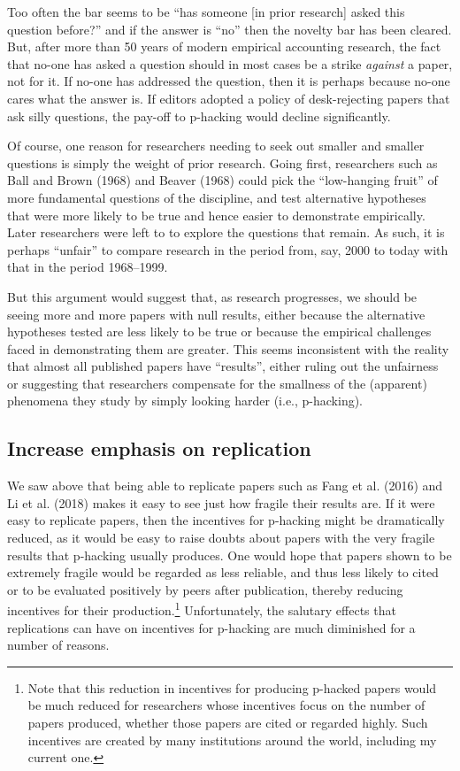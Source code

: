 \documentclass[
  letterpaper,
  DIV=11,
  numbers=noendperiod]{scrartcl}
\begin{document}
Too often the bar seems to be ``has someone {[}in prior research{]}
asked this question before?'' and if the answer is ``no'' then the
novelty bar has been cleared. But, after more than 50 years of modern
empirical accounting research, the fact that no-one has asked a question
should in most cases be a strike \emph{against} a paper, not for it. If
no-one has addressed the question, then it is perhaps because no-one
cares what the answer is. If editors adopted a policy of desk-rejecting
papers that ask silly questions, the pay-off to p-hacking would decline
significantly.

Of course, one reason for researchers needing to seek out smaller and
smaller questions is simply the weight of prior research. Going first,
researchers such as Ball and Brown (1968) and Beaver (1968) could pick
the ``low-hanging fruit'' of more fundamental questions of the
discipline, and test alternative hypotheses that were more likely to be
true and hence easier to demonstrate empirically. Later researchers were
left to to explore the questions that remain. As such, it is perhaps
``unfair'' to compare research in the period from, say, 2000 to today
with that in the period 1968--1999.

But this argument would suggest that, as research progresses, we should
be seeing more and more papers with null results, either because the
alternative hypotheses tested are less likely to be true or because the
empirical challenges faced in demonstrating them are greater. This seems
inconsistent with the reality that almost all published papers have
``results'', either ruling out the unfairness or suggesting that
researchers compensate for the smallness of the (apparent) phenomena
they study by simply looking harder (i.e., p-hacking).

\hypertarget{increase-emphasis-on-replication}{%
\subsection{Increase emphasis on
replication}\label{increase-emphasis-on-replication}}

We saw above that being able to replicate papers such as Fang et al.
(2016) and Li et al. (2018) makes it easy to see just how fragile their
results are. If it were easy to replicate papers, then the incentives
for p-hacking might be dramatically reduced, as it would be easy to
raise doubts about papers with the very fragile results that p-hacking
usually produces. One would hope that papers shown to be extremely
fragile would be regarded as less reliable, and thus less likely to
cited or to be evaluated positively by peers after publication, thereby
reducing incentives for their production.\footnote{Note that this
  reduction in incentives for producing p-hacked papers would be much
  reduced for researchers whose incentives focus on the number of papers
  produced, whether those papers are cited or regarded highly. Such
  incentives are created by many institutions around the world,
  including my current one.} Unfortunately, the salutary effects that
replications can have on incentives for p-hacking are much diminished
for a number of reasons.
\end{document}
